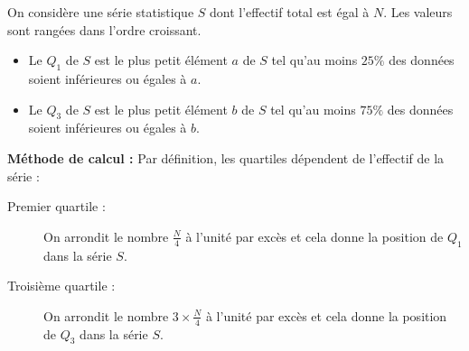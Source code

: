 \documentclass[10pt,openright,twoside,french]{book}
\begin{document}
\begin{Defi}
    On considère une série statistique $S$ dont l'effectif total est égal à $N$. Les valeurs sont rangées dans l'ordre croissant.
    \begin{itemize}
        \item Le  $Q_1$ de $S$ est le plus petit élément $a$ de $S$ tel qu'au moins $25\%$ des données soient inférieures ou égales à $a$.
        \item Le  $Q_3$ de $S$ est le plus petit élément $b$ de $S$ tel qu'au moins $75\%$ des données soient inférieures ou égales à $b$.
    \end{itemize}

\begin{center}
\end{center}
\end{Defi}

\textbf{Méthode de calcul :} Par définition, les quartiles dépendent de l'effectif de la série :
\begin{description}
    \item[Premier quartile :] On arrondit le nombre $\frac{N}{4}$ à l'unité par excès et cela donne la position de $Q_1$ dans la série $S$.
    \item[Troisième quartile :] On arrondit le nombre $3\times\frac{N}{4}$ à l'unité par excès et cela donne la position de $Q_3$ dans la série $S$.
\end{description}
\end{document}
